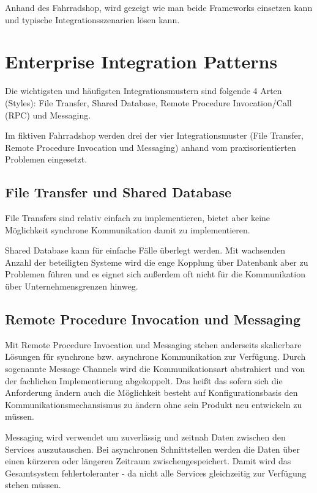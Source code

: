 \documentclass[12pt,a4paper,ngerman]{article}
\begin{document}
Anhand des Fahrradshop, wird gezeigt wie man beide Frameworks einsetzen
kann und typische Integrationsszenarien lösen kann.

\section{Enterprise Integration Patterns}

Die wichtigsten und häufigsten Integrationsmustern sind folgende 4 Arten
(Styles): File Transfer, Shared Database, Remote Procedure
Invocation/Call (RPC) und Messaging.

Im fiktiven Fahrradshop werden drei der vier Integrationsmuster (File
Transfer, Remote Procedure Invocation und Messaging) anhand vom
praxisorientierten Problemen eingesetzt.

\subsection{File Transfer und Shared Database}

File Transfers sind relativ einfach zu implementieren, bietet aber keine
Möglichkeit synchrone Kommunikation damit zu implementieren.

Shared Database kann für einfache Fälle überlegt werden. Mit wachsenden
Anzahl der beteiligten Systeme wird die enge Kopplung über Datenbank
aber zu Problemen führen und es eignet sich außerdem oft nicht für die
Kommunikation über Unternehmensgrenzen hinweg.

\subsection{Remote Procedure Invocation und Messaging}

Mit Remote Procedure Invocation und Messaging stehen anderseits
skalierbare Lösungen für synchrone bzw. asynchrone Kommunikation zur
Verfügung. Durch sogenannte Message Channels wird die Kommunikationsart
abstrahiert und von der fachlichen Implementierung abgekoppelt. Das
heißt das sofern sich die Anforderung ändern auch die Möglichkeit
besteht auf Konfigurationsbasis den Kommunikationsmechansismus zu ändern
ohne sein Produkt neu entwickeln zu müssen.

Messaging wird verwendet um zuverlässig und zeitnah Daten zwischen den
Services auszutauschen. Bei asynchronen Schnittstellen werden die Daten
über einen kürzeren oder längeren Zeitraum zwischengespeichert. Damit
wird das Gesamtsystem fehlertoleranter - da nicht alle Services
gleichzeitig zur Verfügung stehen müssen.
\end{document}
